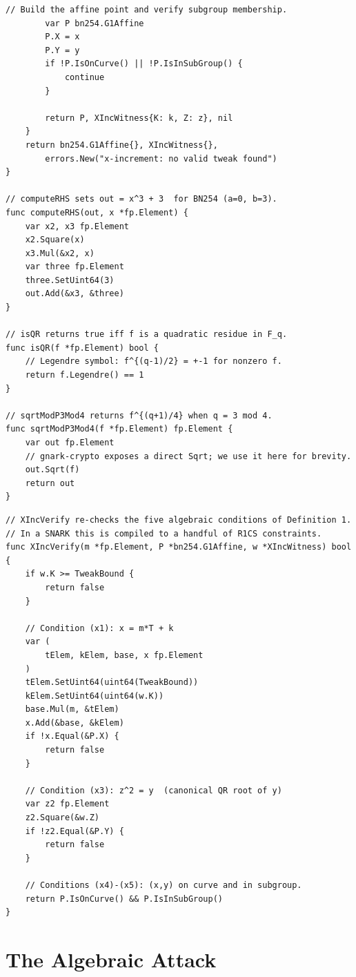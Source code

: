 \documentclass[11pt,a4paper]{article}
\theoremstyle{definition}
\begin{document}
\begin{lstlisting}[caption={GMMZ x-increment constructor (Go, BN254).},
label={lst:x-inc-go}]
        // Build the affine point and verify subgroup membership.
        var P bn254.G1Affine
        P.X = x
        P.Y = y
        if !P.IsOnCurve() || !P.IsInSubGroup() {
            continue
        }

        return P, XIncWitness{K: k, Z: z}, nil
    }
    return bn254.G1Affine{}, XIncWitness{},
        errors.New("x-increment: no valid tweak found")
}

// computeRHS sets out = x^3 + 3  for BN254 (a=0, b=3).
func computeRHS(out, x *fp.Element) {
    var x2, x3 fp.Element
    x2.Square(x)
    x3.Mul(&x2, x)
    var three fp.Element
    three.SetUint64(3)
    out.Add(&x3, &three)
}

// isQR returns true iff f is a quadratic residue in F_q.
func isQR(f *fp.Element) bool {
    // Legendre symbol: f^{(q-1)/2} = +-1 for nonzero f.
    return f.Legendre() == 1
}

// sqrtModP3Mod4 returns f^{(q+1)/4} when q = 3 mod 4.
func sqrtModP3Mod4(f *fp.Element) fp.Element {
    var out fp.Element
    // gnark-crypto exposes a direct Sqrt; we use it here for brevity.
    out.Sqrt(f)
    return out
}
\end{lstlisting}

\begin{lstlisting}[caption={Verifier-side algebraic check of the
x-increment relation.}, label={lst:x-inc-verify}]
// XIncVerify re-checks the five algebraic conditions of Definition 1.
// In a SNARK this is compiled to a handful of R1CS constraints.
func XIncVerify(m *fp.Element, P *bn254.G1Affine, w *XIncWitness) bool {
    if w.K >= TweakBound {
        return false
    }

    // Condition (x1): x = m*T + k
    var (
        tElem, kElem, base, x fp.Element
    )
    tElem.SetUint64(uint64(TweakBound))
    kElem.SetUint64(uint64(w.K))
    base.Mul(m, &tElem)
    x.Add(&base, &kElem)
    if !x.Equal(&P.X) {
        return false
    }

    // Condition (x3): z^2 = y  (canonical QR root of y)
    var z2 fp.Element
    z2.Square(&w.Z)
    if !z2.Equal(&P.Y) {
        return false
    }

    // Conditions (x4)-(x5): (x,y) on curve and in subgroup.
    return P.IsOnCurve() && P.IsInSubGroup()
}
\end{lstlisting}

\section{The Algebraic Attack}
\label{sec:attack}
\end{document}
